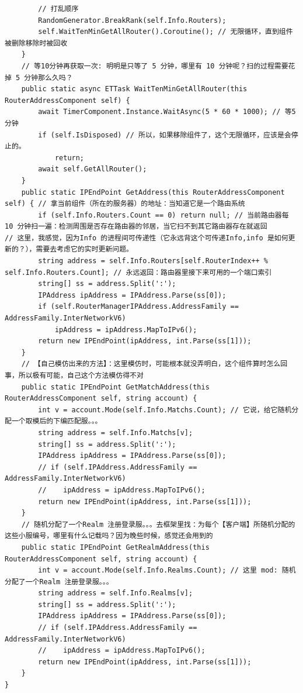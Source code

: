 \documentclass[9pt, b5paper]{article}
\begin{document}
\begin{verbatim}
        // 打乱顺序
        RandomGenerator.BreakRank(self.Info.Routers);
        self.WaitTenMinGetAllRouter().Coroutine(); // 无限循环，直到组件被删除移除时被回收 
    }
    // 等10分钟再获取一次: 明明是只等了 5 分钟，哪里有 10 分钟呢？扫的过程需要花掉 5 分钟那么久吗？
    public static async ETTask WaitTenMinGetAllRouter(this RouterAddressComponent self) {
        await TimerComponent.Instance.WaitAsync(5 * 60 * 1000); // 等5 分钟
        if (self.IsDisposed) // 所以，如果移除组件了，这个无限循环，应该是会停止的。
            return;
        await self.GetAllRouter();
    }
    public static IPEndPoint GetAddress(this RouterAddressComponent self) { // 拿当前组件（所在的服务器）的地址：当知道它是一个路由系统
        if (self.Info.Routers.Count == 0) return null; // 当前路由器每 10 分钟扫一遍：检测周围是否存在路由器的邻居，当它扫不到其它路由器存在就返回
// 这里，我感觉，因为Info 的进程间可传递性（它永远背这个可传递Info,info 是如何更新的？），需要去考虑它的实时更新问题。
        string address = self.Info.Routers[self.RouterIndex++ % self.Info.Routers.Count]; // 永远返回：路由器里接下来可用的一个端口索引
        string[] ss = address.Split(':');
        IPAddress ipAddress = IPAddress.Parse(ss[0]);
        if (self.RouterManagerIPAddress.AddressFamily == AddressFamily.InterNetworkV6) 
            ipAddress = ipAddress.MapToIPv6();
        return new IPEndPoint(ipAddress, int.Parse(ss[1]));
    }
    // 【自己模仿出来的方法】：这里模仿时，可能根本就没弄明白，这个组件算时怎么回事，所以极有可能，自己这个方法模仿得不对
    public static IPEndPoint GetMatchAddress(this RouterAddressComponent self, string account) {
        int v = account.Mode(self.Info.Matchs.Count); // 它说，给它随机分配一个取模后的下编匹配服。。。
        string address = self.Info.Matchs[v];
        string[] ss = address.Split(':');
        IPAddress ipAddress = IPAddress.Parse(ss[0]);
        // if (self.IPAddress.AddressFamily == AddressFamily.InterNetworkV6) 
        //    ipAddress = ipAddress.MapToIPv6();
        return new IPEndPoint(ipAddress, int.Parse(ss[1]));
    }
    // 随机分配了一个Realm 注册登录服。。。去框架里找：为每个【客户端】所随机分配的这些小服编号，哪里有什么记载吗？因为晚些时候，感觉还会用到的
    public static IPEndPoint GetRealmAddress(this RouterAddressComponent self, string account) {
        int v = account.Mode(self.Info.Realms.Count); // 这里 mod: 随机分配了一个Realm 注册登录服。。。
        string address = self.Info.Realms[v];
        string[] ss = address.Split(':');
        IPAddress ipAddress = IPAddress.Parse(ss[0]);
        // if (self.IPAddress.AddressFamily == AddressFamily.InterNetworkV6) 
        //    ipAddress = ipAddress.MapToIPv6();
        return new IPEndPoint(ipAddress, int.Parse(ss[1]));
    }
}
\end{verbatim}
\end{document}
